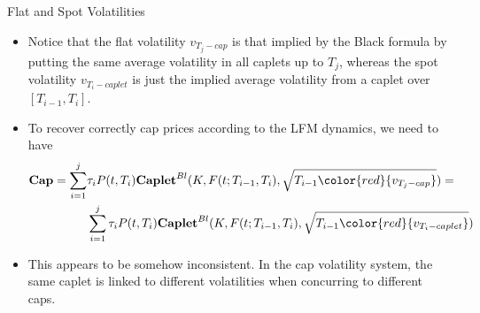 \documentclass{beamer}
\begin{document}
\begin{frame}{Flat and Spot Volatilities}
\begin{itemize}
	\item<1-> Notice that the flat volatility $v_{T_j-cap}$ is that implied by the Black formula by putting the same average volatility in all caplets up to $T_j$, whereas the spot volatility $v_{T_i-caplet}$ is just the implied average volatility from a caplet over $[T_{i-1}, T_i]$.
	\item<2-> To recover correctly cap prices according to the LFM dynamics, we need to have
	\begin{equation}
		\begin{aligned}
		\textbf{Cap} = \sum_{i=1}^j&\tau_iP(t,T_i)\textbf{Caplet}^{Bl}(K,F(t;T_{i-1},T_i),\sqrt{T_{i-1}\color{red}{v_{T_j-cap}}}) = \\ &\sum_{i=1}^j\tau_iP(t,T_i)\textbf{Caplet}^{Bl}(K,F(t;T_{i-1},T_i),\sqrt{T_{i-1}\color{red}{v_{T_i-caplet}}})\\
		\end{aligned}
	\label{eq:spot_flat_vola}
	\end{equation}
	\item<3-> This appears to be somehow inconsistent. In the cap volatility system, the same caplet is linked to different volatilities when concurring to different caps.	
	\end{itemize}
\end{frame}	

\end{document}
